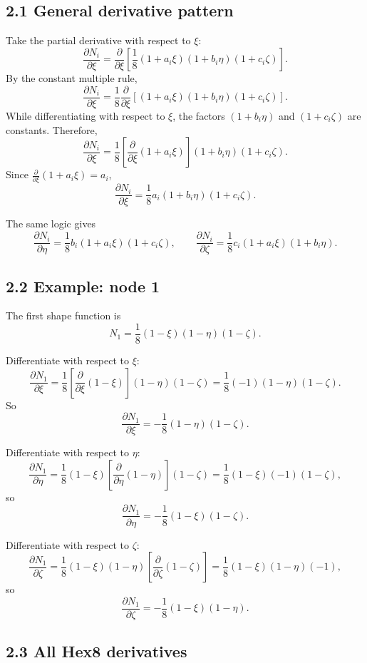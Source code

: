 \documentclass[11pt]{article}
\newcommand{\pd}[2]{\frac{\partial #1}{\partial #2}}
\begin{document}
\subsection*{2.1 General derivative pattern}

Take the partial derivative with respect to $\xi$:
\[
\pd{N_i}{\xi}
=
\pd{}{\xi}
\left[
\frac18(1+a_i\xi)(1+b_i\eta)(1+c_i\zeta)
\right].
\]
By the constant multiple rule,
\[
\pd{N_i}{\xi}
=
\frac18
\pd{}{\xi}
\left[
(1+a_i\xi)(1+b_i\eta)(1+c_i\zeta)
\right].
\]
While differentiating with respect to $\xi$, the factors
$(1+b_i\eta)$ and $(1+c_i\zeta)$ are constants. Therefore,
\[
\pd{N_i}{\xi}
=
\frac18
\left[
\pd{}{\xi}(1+a_i\xi)
\right]
(1+b_i\eta)(1+c_i\zeta).
\]
Since $\pd{}{\xi}(1+a_i\xi)=a_i$,
\[
\boxed{
\pd{N_i}{\xi}
=
\frac18 a_i(1+b_i\eta)(1+c_i\zeta)
}.
\]

The same logic gives
\[
\boxed{
\pd{N_i}{\eta}
=
\frac18 b_i(1+a_i\xi)(1+c_i\zeta)
},
\qquad
\boxed{
\pd{N_i}{\zeta}
=
\frac18 c_i(1+a_i\xi)(1+b_i\eta)
}.
\]

\subsection*{2.2 Example: node 1}

The first shape function is
\[
N_1=\frac18(1-\xi)(1-\eta)(1-\zeta).
\]

Differentiate with respect to $\xi$:
\[
\pd{N_1}{\xi}
=
\frac18
\left[
\pd{}{\xi}(1-\xi)
\right]
(1-\eta)(1-\zeta)
=
\frac18(-1)(1-\eta)(1-\zeta).
\]
So
\[
\boxed{\pd{N_1}{\xi}=-\frac18(1-\eta)(1-\zeta)}.
\]

Differentiate with respect to $\eta$:
\[
\pd{N_1}{\eta}
=
\frac18(1-\xi)
\left[
\pd{}{\eta}(1-\eta)
\right]
(1-\zeta)
=
\frac18(1-\xi)(-1)(1-\zeta),
\]
so
\[
\boxed{\pd{N_1}{\eta}=-\frac18(1-\xi)(1-\zeta)}.
\]

Differentiate with respect to $\zeta$:
\[
\pd{N_1}{\zeta}
=
\frac18(1-\xi)(1-\eta)
\left[
\pd{}{\zeta}(1-\zeta)
\right]
=
\frac18(1-\xi)(1-\eta)(-1),
\]
so
\[
\boxed{\pd{N_1}{\zeta}=-\frac18(1-\xi)(1-\eta)}.
\]

\subsection*{2.3 All Hex8 derivatives}
\end{document}
